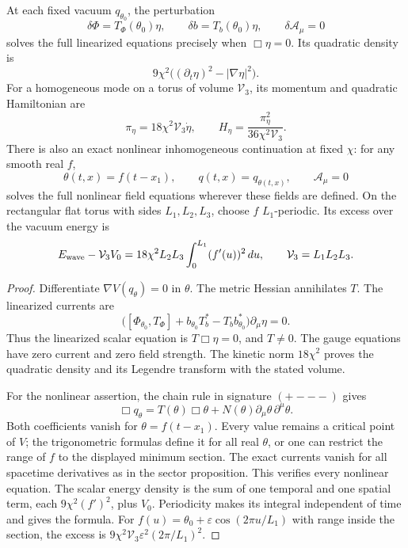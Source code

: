\begin{proposition}
\label{q444:vk-wave}
At each fixed vacuum \(q_{\theta_0}\), the perturbation
\[
 \delta\Phi=T_\Phi(\theta_0)\eta,\qquad
 \delta b=T_b(\theta_0)\eta,\qquad
 \delta\mathcal A_\mu=0
\]
solves the full linearized equations precisely when \(\Box\eta=0\).
Its quadratic density is
\[
 9\chi^2\bigl((\partial_t\eta)^2-|\nabla\eta|^2\bigr).
\]
For a homogeneous mode on a torus of volume \(\mathcal V_3\), its
momentum and quadratic Hamiltonian are
\[
 \pi_\eta=18\chi^2\mathcal V_3\dot\eta,\qquad
 H_\eta=\frac{\pi_\eta^2}{36\chi^2\mathcal V_3}.
\]
There is also an exact nonlinear inhomogeneous continuation at fixed
\(\chi\): for any smooth real \(f\),
\[
 \theta(t,x)=f(t-x_1),\qquad q(t,x)=q_{\theta(t,x)},\qquad
 \mathcal A_\mu=0
\]
solves the full nonlinear field equations wherever these fields are
defined. On the rectangular flat torus with sides \(L_1,L_2,L_3\),
choose \(f\) \(L_1\)-periodic. Its excess over the vacuum energy is
\[
 E_{\rm wave}-\mathcal V_3V_0
 =18\chi^2L_2L_3\int_0^{L_1}(f'(u))^2\,du,\qquad
 \mathcal V_3=L_1L_2L_3.
\]
\end{proposition}
\begin{proof}
Differentiate \(\nabla V(q_\theta)=0\) in \(\theta\). The metric
Hessian annihilates \(T\). The linearized currents are
\[
 \bigl([\Phi_{\theta_0},T_\Phi]+b_{\theta_0}T_b^*
                         -T_b b_{\theta_0}^*\bigr)\partial_\mu\eta=0.
\]
Thus the linearized scalar equation is \(T\Box\eta=0\), and \(T\ne0\).
The gauge equations have zero current and zero field strength.
The kinetic norm \(18\chi^2\) proves the quadratic density and its
Legendre transform with the stated volume.

For the nonlinear assertion, the chain rule in signature \((+---)\)
gives
\[
 \Box q_\theta=T(\theta)\Box\theta
                 +N(\theta)\partial_\mu\theta\,\partial^\mu\theta .
\]
Both coefficients vanish for \(\theta=f(t-x_1)\). Every value remains
a critical point of \(V\); the trigonometric formulas define it for
all real \(\theta\), or one can restrict the range of \(f\) to the
displayed minimum section. The exact currents vanish for all
spacetime derivatives as in the sector proposition. This verifies
every nonlinear equation. The scalar energy density is the sum of
one temporal and one spatial term, each \(9\chi^2(f')^2\), plus \(V_0\).
Periodicity makes its integral independent of time and gives the
formula. For
\(f(u)=\theta_0+\varepsilon\cos(2\pi u/L_1)\) with range inside the
section, the excess is
\(9\chi^2\mathcal V_3\varepsilon^2(2\pi/L_1)^2\).
\end{proof}


